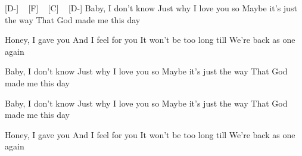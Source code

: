 [D-] ~ [F] ~ [C] ~ [D-]
Baby, I don't know
Just why I love you so
Maybe it's just the way
That God made me this day

Honey, I gave you
And I feel for you
It won't be too long till
We're back as one again

Baby, I don't know
Just why I love you so
Maybe it's just the way
That God made me this day

Baby, I don't know
Just why I love you so
Maybe it's just the way
That God made me this day

Honey, I gave you
And I feel for you
It won't be too long till
We're back as one again
